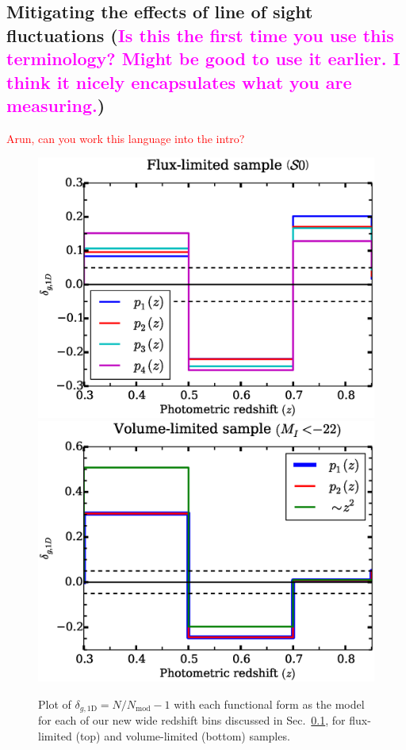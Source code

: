 \documentclass[twocolumn,useAMS,usenatbib]{mn2e}
\newcommand{\rachel}[1]{{\textcolor{red}{#1}}}
\newcommand{\arun}[1]{{\textcolor{blue}{#1}}}
\newcommand{\claire}[1]{{\textcolor{magenta}{#1}}}
\begin{document}
\subsection{Mitigating the effects of line of sight fluctuations (\claire{Is this the first time you use this terminology? Might be good to use it earlier. I think it nicely encapsulates what you are measuring.})}\label{sec:mitigation}
\rachel{Arun, can you work this language into the intro?}

\begin{figure}
 \centering
 \includegraphics[width=1.0\columnwidth]{redshift_fluxlimited_wide}
 \includegraphics[width=1.0\columnwidth]{redshift_vollimited_wide}
 \caption{Plot of $\delta_{g,\text{1D}} =  N/N_{\text{mod}}-1$ with each functional form as the model
           for each of our new wide redshift bins discussed in Sec.~\ref{sec:mitigation}, for flux-limited (top) and
           volume-limited (bottom) samples.
          }
 \label{fig:redshift_wide}          
\end{figure}
\end{document}
